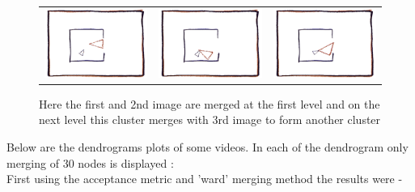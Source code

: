 \documentclass[11pt, twocolumn]{article}
\begin{document}
\begin{figure}[H]
\centering
\begin{tabular}{ccc}
\includegraphics[scale=0.18]{coax210.png} &
\includegraphics[scale=0.18]{coax220.png} &
\includegraphics[scale=0.18]{coax240.png} 
\end{tabular}
\caption{Here the first and 2nd image are merged at the first level and on the next level this cluster merges with 3rd image to form another cluster}
\end{figure}


Below are the dendrograms plots of some videos. In each of the dendrogram only merging of $30$ nodes is displayed :\\
First using the acceptance metric and 'ward' merging method the results were - \\
\end{document}
